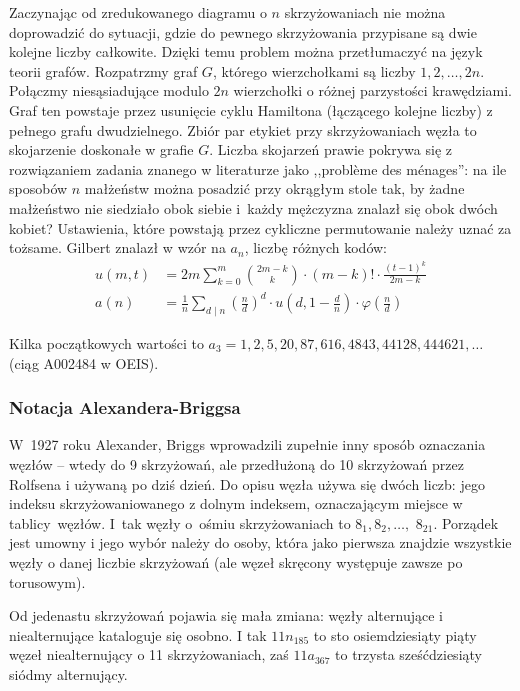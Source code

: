 Zaczynając od zredukowanego diagramu o $n$ skrzyżowaniach nie można doprowadzić do sytuacji, gdzie do pewnego skrzyżowania przypisane są dwie kolejne liczby całkowite.
Dzięki temu problem można przetłumaczyć na język teorii grafów.
Rozpatrzmy graf $G$, którego wierzchołkami są liczby $1, 2, \ldots, 2n$.
Połączmy niesąsiadujące modulo $2n$ wierzchołki o różnej parzystości krawędziami.
Graf ten powstaje przez usunięcie cyklu Hamiltona (łączącego kolejne liczby) z pełnego grafu dwudzielnego.
Zbiór par etykiet przy skrzyżowaniach węzła to skojarzenie doskonałe w grafie $G$.
Liczba skojarzeń prawie pokrywa się z rozwiązaniem zadania znanego w literaturze jako ,,problème des ménages'': na ile sposobów $n$ małżeństw można posadzić przy okrągłym stole tak, by żadne małżeństwo nie siedziało obok siebie i~każdy mężczyzna znalazł się obok dwóch kobiet?
Ustawienia, które powstają przez cykliczne permutowanie należy uznać za tożsame.
Gilbert znalazł w \cite{gilbert56} wzór na $a_n$, liczbę różnych kodów:
\begin{align}
u(m, t) & = 2m \sum_{k=0}^m {2m-k \choose k} \cdot (m-k)! \cdot \frac{(t-1)^k}{2m - k}  \\
a(n) & = \frac{1}{n} \sum_{d\mid n} \left(\frac{n}{d}\right)^d \cdot u \left(d, 1 - \frac{d}{n}\right) \cdot \varphi \left(\frac{n}{d}\right)
\end{align}

Kilka początkowych wartości to $a_3 = 1, 2, 5, 20, 87, 616, 4843, 44128, 444621, \ldots$ (ciąg A002484 w OEIS).

\subsubsection{Notacja Alexandera-Briggsa}
W~1927 roku Alexander, Briggs wprowadzili zupełnie inny sposób oznaczania węzłów -- wtedy do 9 skrzyżowań, ale przedłużoną do 10 skrzyżowań przez Rolfsena i używaną po dziś dzień.
Do opisu węzła używa się dwóch liczb: jego indeksu skrzyżowaniowanego z dolnym indeksem, oznaczającym miejsce w tablicy~węzłów.
I~tak węzły o~ośmiu skrzyżowaniach to $8_1, 8_2, \ldots,$ $8_{21}$.
Porządek jest umowny i jego wybór należy do osoby, która jako pierwsza znajdzie wszystkie węzły o danej liczbie skrzyżowań (ale węzeł skręcony występuje zawsze po torusowym).
%
%

Od jedenastu skrzyżowań pojawia się mała zmiana: węzły alternujące i niealternujące kataloguje się osobno.
I tak $11n_{185}$ to sto osiemdziesiąty piąty węzeł niealternujący o 11 skrzyżowaniach, zaś $11a_{367}$ to trzysta sześćdziesiąty siódmy alternujący.

